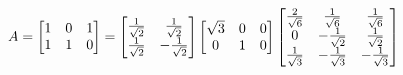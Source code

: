 \documentclass[preview]{standalone}
\begin{document}
\begin{align*}
\special{dvisvgm:raw <g id='unique000'>}A = \begin{bmatrix} 1 & 0 & 1 \\ 1 & 1 & 0 \end{bmatrix} \special{dvisvgm:raw </g>}\special{dvisvgm:raw <g id='unique001'>}= \begin{bmatrix} \frac{1}{\sqrt{2}} & \frac{1}{\sqrt{2}} \\ \frac{1}{\sqrt{2}} & -\frac{1}{\sqrt{2}} \end{bmatrix} \special{dvisvgm:raw </g>}\special{dvisvgm:raw <g id='unique002'>}\begin{bmatrix} \sqrt{3} & 0 & 0 \\ 0 & 1 & 0 \end{bmatrix} \special{dvisvgm:raw </g>}\special{dvisvgm:raw <g id='unique003'>}\begin{bmatrix} \frac{2}{\sqrt{6}} & \frac{1}{\sqrt{6}} & \frac{1}{\sqrt{6}} \\ 0 & -\frac{1}{\sqrt{2}} & \frac{1}{\sqrt{2}} \\ \frac{1}{\sqrt{3}} & -\frac{1}{\sqrt{3}} & -\frac{1}{\sqrt{3}} \end{bmatrix}\special{dvisvgm:raw </g>}
\end{align*}
\end{document}
